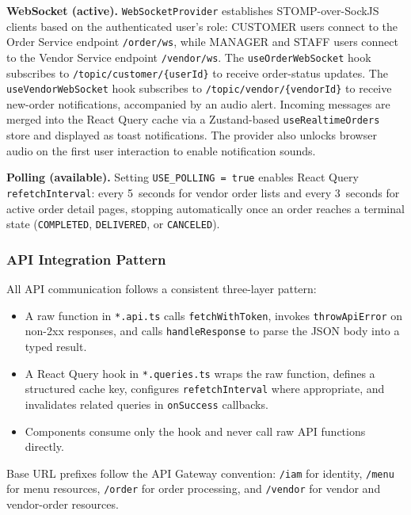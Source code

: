 \vspace{0.25cm}
\noindent
\textbf{WebSocket (active).} \texttt{WebSocketProvider} establishes STOMP-over-SockJS clients based on the authenticated user's role: CUSTOMER users connect to the Order Service endpoint \texttt{/order/ws}, while MANAGER and STAFF users connect to the Vendor Service endpoint \texttt{/vendor/ws}.
The \texttt{useOrderWebSocket} hook subscribes to \texttt{/topic/customer/\{userId\}} to receive order-status updates.
The \texttt{useVendorWebSocket} hook subscribes to \texttt{/topic/vendor/\{vendorId\}} to receive new-order notifications, accompanied by an audio alert.
Incoming messages are merged into the React Query cache via a Zustand-based \texttt{useRealtimeOrders} store and displayed as toast notifications.
The provider also unlocks browser audio on the first user interaction to enable notification sounds.

\vspace{0.25cm}
\noindent
\textbf{Polling (available).} Setting \texttt{USE\_POLLING = true} enables React Query \texttt{refetchInterval}: every 5~seconds for vendor order lists and every 3~seconds for active order detail pages, stopping automatically once an order reaches a terminal state (\texttt{COMPLETED}, \texttt{DELIVERED}, or \texttt{CANCELED}).

\subsubsection{API Integration Pattern}
All API communication follows a consistent three-layer pattern:
\begin{itemize}
    \item A raw function in \texttt{*.api.ts} calls \texttt{fetchWithToken}, invokes \texttt{throwApiError} on non-2xx responses, and calls \texttt{handleResponse} to parse the JSON body into a typed result.
    \item A React Query hook in \texttt{*.queries.ts} wraps the raw function, defines a structured cache key, configures \texttt{refetchInterval} where appropriate, and invalidates related queries in \texttt{onSuccess} callbacks.
    \item Components consume only the hook and never call raw API functions directly.
\end{itemize}

\noindent
Base URL prefixes follow the API Gateway convention: \texttt{/iam} for identity, \texttt{/menu} for menu resources, \texttt{/order} for order processing, and \texttt{/vendor} for vendor and vendor-order resources.

